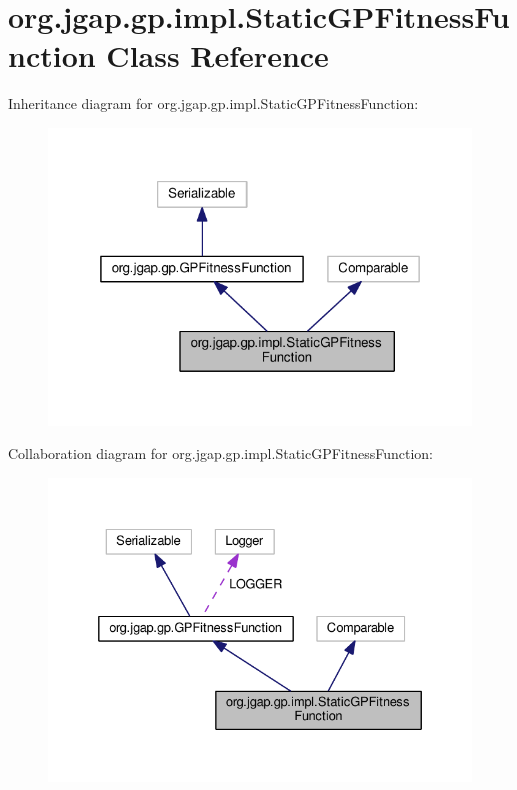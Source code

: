 \hypertarget{classorg_1_1jgap_1_1gp_1_1impl_1_1_static_g_p_fitness_function}{\section{org.\-jgap.\-gp.\-impl.\-Static\-G\-P\-Fitness\-Function Class Reference}
\label{classorg_1_1jgap_1_1gp_1_1impl_1_1_static_g_p_fitness_function}
}


Inheritance diagram for org.\-jgap.\-gp.\-impl.\-Static\-G\-P\-Fitness\-Function\-:
\nopagebreak
\begin{figure}[H]
\begin{center}
\leavevmode
\includegraphics[width=319pt]{classorg_1_1jgap_1_1gp_1_1impl_1_1_static_g_p_fitness_function__inherit__graph}
\end{center}
\end{figure}


Collaboration diagram for org.\-jgap.\-gp.\-impl.\-Static\-G\-P\-Fitness\-Function\-:
\nopagebreak
\begin{figure}[H]
\begin{center}
\leavevmode
\includegraphics[width=332pt]{classorg_1_1jgap_1_1gp_1_1impl_1_1_static_g_p_fitness_function__coll__graph}
\end{center}
\end{figure}
